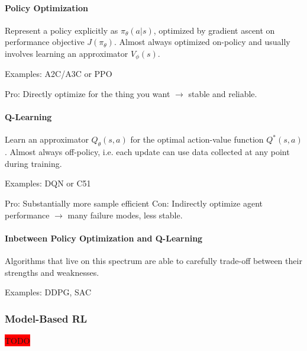 \paragraph{Policy Optimization} Represent a policy explicitly as \(\pi_{\theta}(a |s)\), optimized by gradient ascent on performance objective \(J(\pi_{\theta})\). Almost always optimized on-policy and usually involves learning an approximator $V_{\phi}(s)$.

Examples: A2C/A3C or PPO

Pro: Directly optimize for the thing you want \(\rightarrow\) stable and reliable.

\paragraph{Q-Learning} Learn an approximator \(Q_{\theta}(s,a)\) for the optimal action-value function \(Q^*(s,a)\). Almost always off-policy, i.e. each update can use data collected at any point during training.

Examples: DQN or C51

Pro: Substantially more sample efficient
Con: Indirectly optimize agent performance \(\rightarrow\) many failure modes, less stable.

\paragraph{Inbetween Policy Optimization and Q-Learning}
Algorithms that live on this spectrum are able to carefully trade-off between their strengths and weaknesses.

Examples: DDPG, SAC

\subsubsection{Model-Based RL}
\colorbox{red}{TODO}
